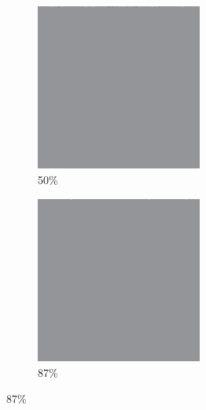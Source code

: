 \documentclass[12pt, fleqn]{report}                             %
\theoremstyle{break}                                            %
\begin{document}
\begin{figure}[ht!]
\begin{subfigure}[b]{0.4\linewidth}
          \includegraphics[width=0.6\textwidth]{Images/23/c.png}
          \caption{50\%}
        \end{subfigure}
        \begin{subfigure}[b]{0.4\linewidth}
          \includegraphics[width=0.6\textwidth]{Images/23/d.png}
          \caption{87\%}
        \end{subfigure}
      \end{figure}
\end{document}

